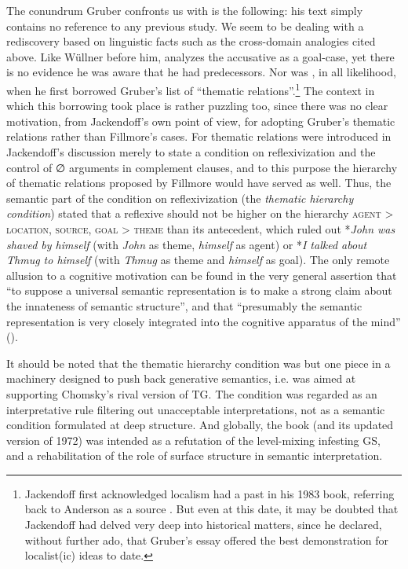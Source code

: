 \documentclass[english,output=paper,colorlinks,citecolor=brown]{../langscibook}
\begin{document}
The conundrum Gruber confronts us with is the following: his text simply contains no reference to any previous study. We seem to be dealing with a rediscovery based on linguistic facts such as the cross-domain analogies cited above. Like Wüllner before him, \citet{Gruber1967} analyzes the accusative as a goal-case, yet there is no evidence he was aware that he had predecessors. Nor was \citet{Jackendoff1969}, in all likelihood, when he first borrowed Gruber’s list of “thematic relations”.\footnote{Jackendoff first acknowledged localism had a past in his 1983 book, referring back to Anderson as a source \citep[188]{Jackendoff1983}. But even at this date, it may be doubted that Jackendoff had delved very deep into historical matters, since he declared, without further ado, that Gruber’s essay offered the best demonstration for localist(ic) ideas to date.} The context in which this borrowing took place is rather puzzling too, since there was no clear motivation, from Jackendoff’s own point of view, for adopting Gruber’s thematic relations rather than Fillmore’s cases. For thematic relations were introduced in Jackendoff’s discussion merely to state a condition on reflexivization and the control of ∅ arguments in complement clauses, and to this purpose the hierarchy of thematic relations proposed by Fillmore would have served as well. Thus, the semantic part of the condition on reflexivization (the \textit{thematic hierarchy condition}) stated that a reflexive should not be higher on the hierarchy \textsc{agent} {\textgreater} \textsc{location}, \textsc{source}, \textsc{goal} {\textgreater} \textsc{theme} than its antecedent, which ruled out *\textit{John was shaved by himself} (with \textit{John} as theme, \textit{himself} as agent) or *\textit{I talked about Thmug to himself} (with \textit{Thmug} as theme and \textit{himself} as goal). The only remote allusion to a cognitive motivation can be found in the very general assertion that “to suppose a universal semantic representation is to make a strong claim about the innateness of semantic structure”, and that “presumably the semantic representation is very closely integrated into the cognitive apparatus of the mind” (\citeyear[1]{Jackendoff1969}).

It should be noted that the thematic hierarchy condition was but one piece in a machinery designed to push back generative semantics, i.e. was aimed at supporting Chomsky’s rival version of TG. The condition was regarded as an interpretative rule filtering out unacceptable interpretations, not as a semantic condition formulated at deep structure. And globally, the book (and its updated version of 1972) was intended as a refutation of the level-mixing infesting GS, and a rehabilitation of the role of surface structure in semantic interpretation.
\end{document}
